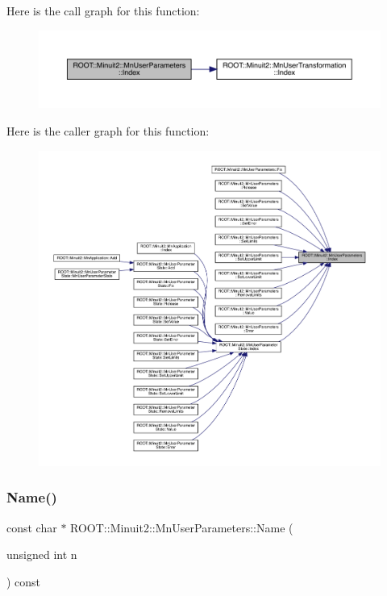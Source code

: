 Here is the call graph for this function\+:
\nopagebreak
\begin{figure}[H]
\begin{center}
\leavevmode
\includegraphics[width=350pt]{d6/d10/classROOT_1_1Minuit2_1_1MnUserParameters_a30523af61ec1c817b0eb060d560f9a95_cgraph}
\end{center}
\end{figure}
Here is the caller graph for this function\+:
\nopagebreak
\begin{figure}[H]
\begin{center}
\leavevmode
\includegraphics[width=350pt]{d6/d10/classROOT_1_1Minuit2_1_1MnUserParameters_a30523af61ec1c817b0eb060d560f9a95_icgraph}
\end{center}
\end{figure}
\mbox{\label{classROOT_1_1Minuit2_1_1MnUserParameters_a1228bfaf2fd8b6f27ac5c302644e5120}} 
\subsubsection{\texorpdfstring{Name()}{Name()}\hspace{0.1cm}{\footnotesize\ttfamily [1/3]}}
{\footnotesize\ttfamily const char $\ast$ R\+O\+O\+T\+::\+Minuit2\+::\+Mn\+User\+Parameters\+::\+Name (\begin{DoxyParamCaption}\item[{unsigned int}]{n }\end{DoxyParamCaption}) const}

